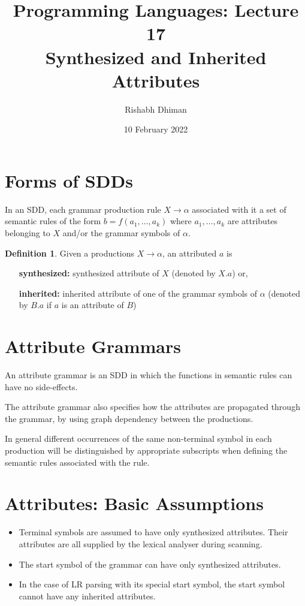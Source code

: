 \documentclass[a4paper]{scrartcl}
\title{
	Programming Languages: Lecture 17\\
	Synthesized and Inherited Attributes
}
\author{Rishabh Dhiman}
\date{10 February 2022}
\theoremstyle{definition}
\newtheorem{definition}{Definition}
\begin{document}
\maketitle

\section{Forms of SDDs}
In an SDD, each grammar production rule $X \to \alpha$ associated with it a set of semantic rules of the form $b = f(a_1, \dots, a_k)$ where $a_1, \dots, a_k$ are attributes belonging to $X$ and/or the grammar symbols of $\alpha$.

\begin{definition}
	Given a productions $X \to \alpha$, an attributed $a$ is
	\begin{itemize}
		\item[\textbf{synthesized:}] synthesized attribute of $X$ (denoted by $X.a$) or,
		\item[\textbf{inherited:}] inherited attribute of one of the grammar symbols of $\alpha$ (denoted by $B.a$ if $a$ is an attribute of $B$)
	\end{itemize}
\end{definition}

\section{Attribute Grammars}
An attribute grammar is an SDD in which the functions in semantic rules can have no side-effects.

The attribute grammar also specifies how the attributes are propagated through the grammar, by using graph dependency between the productions.

In general different occurrences of the same non-terminal symbol in each production will be distinguished by appropriate subscripts when defining the semantic rules associated with the rule.

\section{Attributes: Basic Assumptions}
\begin{itemize}
	\item Terminal symbols are assumed to have only synthesized attributes. Their
attributes are all supplied by the lexical analyser during scanning.
\item The start symbol of the grammar can have only synthesized attributes.
	\item In the case of LR parsing with its special start symbol, the start symbol
cannot have any inherited attributes.
\end{itemize}
\end{document}
